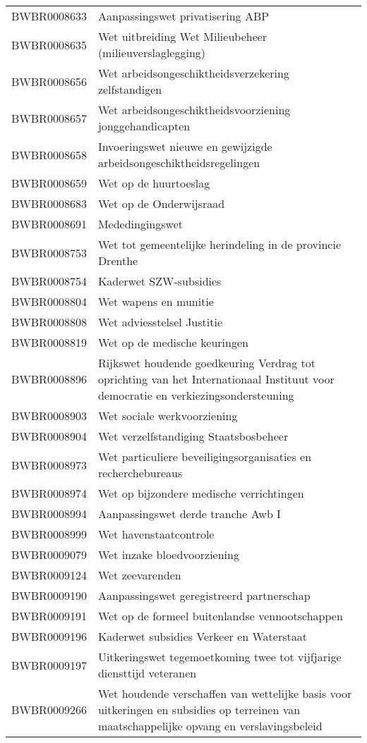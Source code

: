 \begin{longtable}{lp{}}
BWBR0008633 & Aanpassingswet privatisering ABP \\
BWBR0008635 & Wet uitbreiding Wet Milieubeheer (milieuverslaglegging) \\
BWBR0008656 & Wet arbeidsongeschiktheidsverzekering zelfstandigen \\
BWBR0008657 & Wet arbeidsongeschiktheidsvoorziening jonggehandicapten \\
BWBR0008658 & Invoeringswet nieuwe en gewijzigde arbeidsongeschiktheidsregelingen \\
BWBR0008659 & Wet op de huurtoeslag \\
BWBR0008683 & Wet op de Onderwijsraad \\
BWBR0008691 & Mededingingswet \\
BWBR0008753 & Wet tot gemeentelijke herindeling in de provincie Drenthe \\
BWBR0008754 & Kaderwet SZW-subsidies \\
BWBR0008804 & Wet wapens en munitie \\
BWBR0008808 & Wet adviesstelsel Justitie \\
BWBR0008819 & Wet op de medische keuringen \\
BWBR0008896 & Rijkswet houdende goedkeuring Verdrag tot oprichting van het Internationaal Instituut voor democratie en verkiezingsondersteuning \\
BWBR0008903 & Wet sociale werkvoorziening \\
BWBR0008904 & Wet verzelfstandiging Staatsbosbeheer \\
BWBR0008973 & Wet particuliere beveiligingsorganisaties en recherchebureaus \\
BWBR0008974 & Wet op bijzondere medische verrichtingen \\
BWBR0008994 & Aanpassingswet derde tranche Awb I \\
BWBR0008999 & Wet havenstaatcontrole \\
BWBR0009079 & Wet inzake bloedvoorziening \\
BWBR0009124 & Wet zeevarenden \\
BWBR0009190 & Aanpassingswet geregistreerd partnerschap \\
BWBR0009191 & Wet op de formeel buitenlandse vennootschappen \\
BWBR0009196 & Kaderwet subsidies Verkeer en Waterstaat \\
BWBR0009197 & Uitkeringswet tegemoetkoming twee tot vijfjarige diensttijd veteranen \\
BWBR0009266 & Wet houdende verschaffen van wettelijke basis voor uitkeringen en subsidies op terreinen van maatschappelijke opvang en verslavingsbeleid \\

\end{longtable}
